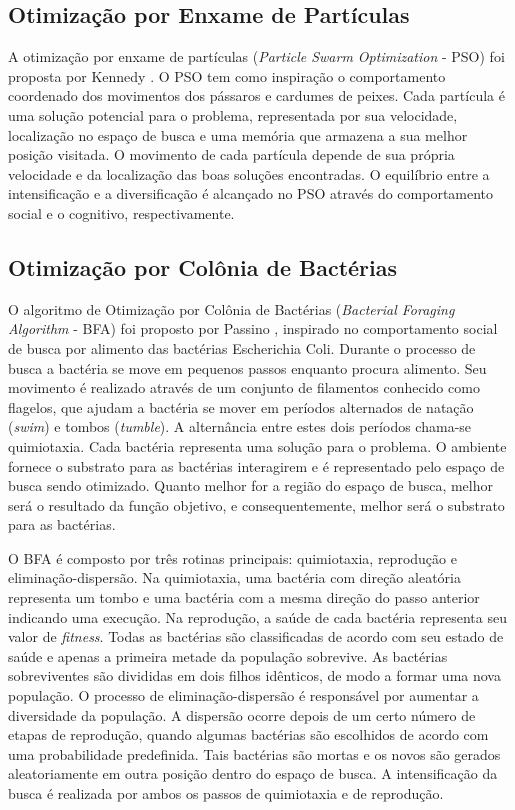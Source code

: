 \subsection{Otimização por Enxame de Partículas}
\label{sec:particle_swarm_optimization}
A otimização por enxame de partículas (\textit{Particle Swarm Optimization} - PSO) foi proposta por Kennedy \cite{pso}. O PSO tem como inspiração o comportamento coordenado dos movimentos dos pássaros e cardumes de peixes. Cada partícula é uma solução potencial para o problema, representada por sua velocidade, localização no espaço de busca e uma memória que armazena a sua melhor posição visitada. O movimento de cada partícula depende de sua própria velocidade e da localização das boas soluções encontradas. O equilíbrio entre a intensificação e a diversificação é alcançado no PSO através do comportamento social e o cognitivo, respectivamente.

\subsection{Otimização por Colônia de Bactérias}
\label{sec:biomimicry_bacterial_foraging}
O algoritmo de Otimização por Colônia de Bactérias (\textit{Bacterial Foraging Algorithm} - BFA) foi proposto por Passino \cite{passino2002biomimicry}, inspirado no comportamento social de busca por alimento das bactérias Escherichia Coli. Durante o processo de busca a bactéria se move em pequenos passos enquanto procura alimento. Seu movimento é realizado através de um conjunto de filamentos conhecido como flagelos, que ajudam a bactéria se mover em períodos alternados de natação (\textit{swim}) e tombos (\textit{tumble}). A alternância entre estes dois períodos chama-se quimiotaxia. Cada bactéria representa uma solução para o problema. O ambiente fornece o substrato para as bactérias interagirem e é representado pelo espaço de busca sendo otimizado. Quanto melhor for a região do espaço de busca, melhor será o resultado da função objetivo, e consequentemente, melhor será o substrato para as bactérias.

O BFA é composto por três rotinas principais: quimiotaxia, reprodução e eliminação-dispersão. Na quimiotaxia, uma bactéria com direção aleatória representa um tombo e uma bactéria com a mesma direção do passo anterior indicando uma execução. Na reprodução, a saúde de cada bactéria representa seu valor de \textit{fitness}. Todas as bactérias são classificadas de acordo com seu estado de saúde e apenas a primeira metade da população sobrevive. As bactérias sobreviventes são divididas em dois filhos idênticos, de modo a formar uma nova população. O processo de eliminação-dispersão é responsável por aumentar a diversidade da população. A dispersão ocorre depois de um certo número de etapas de reprodução, quando algumas bactérias são escolhidos de acordo com uma probabilidade predefinida. Tais bactérias são mortas e os novos são gerados aleatoriamente em outra posição dentro do espaço de busca. A intensificação da busca é realizada por ambos os passos de quimiotaxia e de reprodução.

